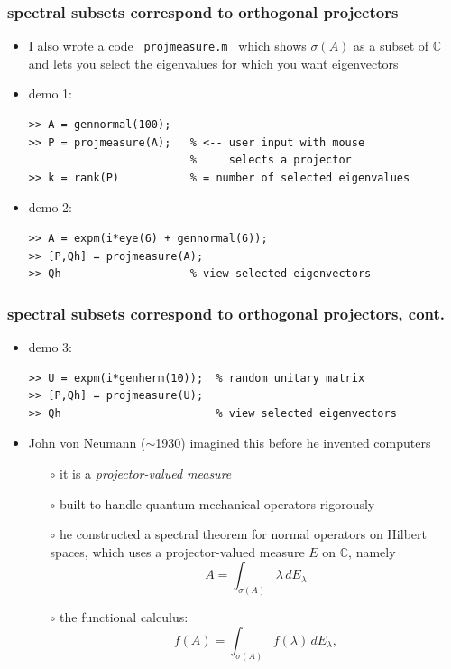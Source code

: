 \documentclass[10pt,hyperref]{beamer}
\newcommand{\CC}{\mathbb{C}}
\begin{document}
\begin{frame}[fragile]
\frametitle{spectral subsets correspond to orthogonal projectors}

\begin{itemize}
\item I also wrote a code \, \texttt{projmeasure.m} \, which shows $\sigma(A)$ as a subset of $\CC$ and lets you select the eigenvalues for which you want eigenvectors
\item demo 1:

\begin{Verbatim}[fontsize=\small]
>> A = gennormal(100);
>> P = projmeasure(A);   % <-- user input with mouse
                         %     selects a projector
>> k = rank(P)           % = number of selected eigenvalues
\end{Verbatim}

\item demo 2:

\begin{Verbatim}[fontsize=\small]
>> A = expm(i*eye(6) + gennormal(6));
>> [P,Qh] = projmeasure(A);
>> Qh                    % view selected eigenvectors
\end{Verbatim}
\end{itemize}
\end{frame}


\begin{frame}[fragile]
\frametitle{spectral subsets correspond to orthogonal projectors, cont.}

\begin{itemize}
\item demo 3:

\begin{Verbatim}[fontsize=\small]
>> U = expm(i*genherm(10));  % random unitary matrix
>> [P,Qh] = projmeasure(U);
>> Qh                        % view selected eigenvectors
\end{Verbatim}

\bigskip
\item John von Neumann ($\sim$1930) imagined this before he invented computers
    \begin{itemize}
    \item[$\circ$] it is a \emph{projector-valued measure}
    \item[$\circ$] built to handle quantum mechanical operators rigorously
    \item[$\circ$] he constructed a spectral theorem for normal operators on Hilbert spaces,  which uses a projector-valued measure $E$ on $\CC$, namely
    	$$A = \int_{\sigma(A)} \lambda\,dE_\lambda$$
    \item[$\circ$] the functional calculus:
    	$$f(A) = \int_{\sigma(A)} f(\lambda)\,dE_\lambda,$$
    \end{itemize}

\end{itemize}
\end{frame}
\end{document}
